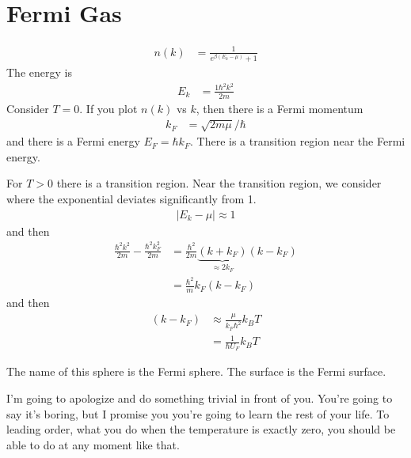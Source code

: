 \section{Fermi Gas}
\begin{align}
    n(k) &=
    \frac{1}{e^{\beta\left( E_k - \mu \right)} + 1}
\end{align}
The energy is
\begin{align}
    E_k &=
    \frac{1\hbar^2 k^2}{2m}
\end{align}
Consider $T=0$.
If you plot $n(k)$ vs $k$,
then there is a Fermi momentum
\begin{align}
    k_F &=
    \sqrt{2m \mu}/\hbar
\end{align}
and there is a Fermi energy $E_F = \hbar k_F$.
There is a transition region near the Fermi energy.

For $T>0$ there is a transition region.
Near the transition region,
we consider where the exponential deviates significantly from 1.
\begin{align}
    \left|E_k - \mu\right| \approx 1
\end{align}
and then
\begin{align}
    \frac{\hbar^2 k^2}{2m}
    -
    \frac{\hbar^2 k_F^2}{2m}
    &=
    \frac{\hbar^2}{2m}
    \underbrace{
    \left( k + k_F \right)
    }_{\approx 2k_F}
    \left( k - k_F \right)\\
    &=
    \frac{\hbar^2}{m}k_F (k - k_F)
\end{align}
and then
\begin{align}
    \left( k - k_F \right)
    &\approx
    \frac{\mu}{k_F \hbar^2} k_B T\\
    &=
    \frac{1}{\hbar U_F} k_B T
\end{align}

The name of this sphere is the Fermi sphere.
The surface is the Fermi surface.

I'm going to apologize and do something trivial in front of you.
You're going to say it's boring,
but I promise you you're going to learn the rest of your life.
To leading order,
what you do when the temperature is exactly zero,
you should be able to do at any moment like that.

